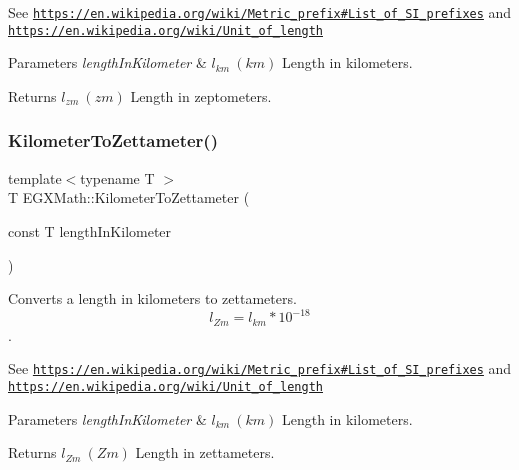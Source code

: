 See \href{https://en.wikipedia.org/wiki/Metric_prefix#List_of_SI_prefixes}{\tt https\+://en.\+wikipedia.\+org/wiki/\+Metric\+\_\+prefix\#\+List\+\_\+of\+\_\+\+S\+I\+\_\+prefixes} and \href{https://en.wikipedia.org/wiki/Unit_of_length}{\tt https\+://en.\+wikipedia.\+org/wiki/\+Unit\+\_\+of\+\_\+length} 
\begin{DoxyParams}{Parameters}
{\em length\+In\+Kilometer} & $ l_{km}\ (km)$ Length in kilometers. \\
\hline
\end{DoxyParams}
\begin{DoxyReturn}{Returns}
$ l_{zm}\ (zm)$ Length in zeptometers. 
\end{DoxyReturn}
\mbox{\label{group___e_g_x_math-_conversions-_length_conversions-_kilometer-_s_i_ga85792ebcdaa5c8289da781417c88963d}} 
\subsubsection{\texorpdfstring{Kilometer\+To\+Zettameter()}{KilometerToZettameter()}}
{\footnotesize\ttfamily template$<$typename T $>$ \\
T E\+G\+X\+Math\+::\+Kilometer\+To\+Zettameter (\begin{DoxyParamCaption}\item[{const T}]{length\+In\+Kilometer }\end{DoxyParamCaption})}



Converts a length in kilometers to zettameters. \[ l_{Zm}=l_{km} * 10^{-18} \]. 

See \href{https://en.wikipedia.org/wiki/Metric_prefix#List_of_SI_prefixes}{\tt https\+://en.\+wikipedia.\+org/wiki/\+Metric\+\_\+prefix\#\+List\+\_\+of\+\_\+\+S\+I\+\_\+prefixes} and \href{https://en.wikipedia.org/wiki/Unit_of_length}{\tt https\+://en.\+wikipedia.\+org/wiki/\+Unit\+\_\+of\+\_\+length} 
\begin{DoxyParams}{Parameters}
{\em length\+In\+Kilometer} & $ l_{km}\ (km)$ Length in kilometers. \\
\hline
\end{DoxyParams}
\begin{DoxyReturn}{Returns}
$ l_{Zm}\ (Zm)$ Length in zettameters. 
\end{DoxyReturn}
